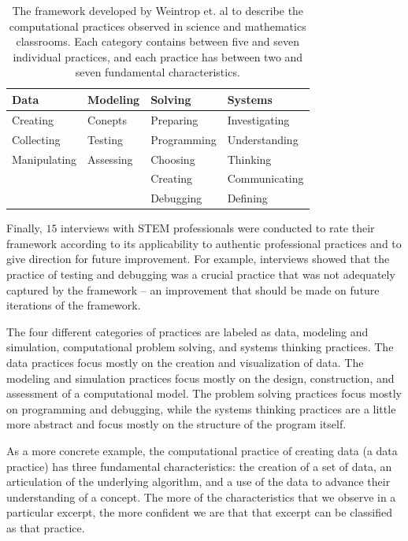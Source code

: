 \documentclass{msuphddissertation}
\begin{document}
\begin{doublespace}
\begin{table}[hb]\centering
\begin{tabular}{llll}\hline\hline
Data         & Modeling     & Solving     & Systems       \\\hline
Creating     & Conepts      & Preparing   & Investigating \\
Collecting   & Testing      & Programming & Understanding \\
Manipulating & Assessing    & Choosing    & Thinking      \\
             &              & Creating    & Communicating \\
             &              & Debugging   & Defining      \\\hline\hline
\end{tabular}
\caption{The framework developed by Weintrop et. al to describe the computational practices observed in science and mathematics classrooms.  Each category contains between five and seven individual practices, and each practice has between two and seven fundamental characteristics.}\label{CH2:Framework}
\end{table}

Finally, $15$ interviews with STEM professionals were conducted to rate their framework according to its applicability to authentic professional practices and to give direction for future improvement.  For example, interviews showed that the practice of testing and debugging was a crucial practice that was not adequately captured by the framework -- an improvement that should be made on future iterations of the framework.

The four different categories of practices are labeled as data, modeling and simulation, computational problem solving, and systems thinking practices.  The data practices focus mostly on the creation and visualization of data.  The modeling and simulation practices focus mostly on the design, construction, and assessment of a computational model.  The problem solving practices focus mostly on programming and debugging, while the systems thinking practices are a little more abstract and focus mostly on the structure of the program itself.

As a more concrete example, the computational practice of creating data (a data practice) has three fundamental characteristics: the creation of a set of data, an articulation of the underlying algorithm, and a use of the data to advance their understanding of a concept.  The more of the characteristics that we observe in a particular excerpt, the more confident we are that that excerpt can be classified as that practice.


\end{doublespace}
\end{document}
